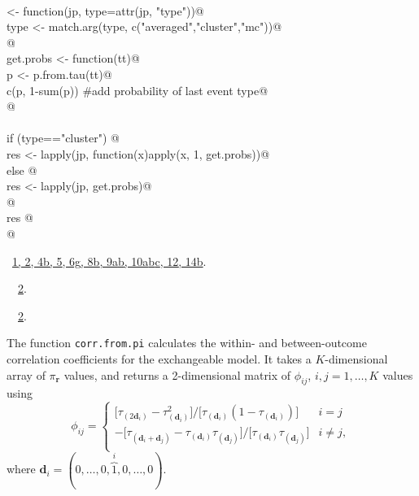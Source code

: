 \documentclass[reqno]{amsart}
\renewcommand{\NWlink}[2]{\hyperlink{#1}{#2}}
\newcommand{\rvec}{\mathbf{r}}
\newcommand{\dvec}{\mathbf{d}}
\begin{document}
\begin{flushleft}
\begin{list}{}{}
\mbox{}\verb@@\\
\mbox{}\verb@uniprobs <- function(jp, type=attr(jp, "type")){@\\
\mbox{}\verb@  type <- match.arg(type, c("averaged","cluster","mc"))@\\
\mbox{}\verb@  @\\
\mbox{}\verb@  get.probs <- function(tt){@\\
\mbox{}\verb@    p <- p.from.tau(tt)@\\
\mbox{}\verb@    c(p, 1-sum(p)) #add probability of last event type@\\
\mbox{}\verb@  }@\\
\mbox{}\verb@@\\
\mbox{}\verb@  if (type=="cluster") {@\\
\mbox{}\verb@    res <- lapply(jp, function(x)apply(x, 1, get.probs))@\\
\mbox{}\verb@  } else {@\\
\mbox{}\verb@    res <- lapply(jp, get.probs)@\\
\mbox{}\verb@  }@\\
\mbox{}\verb@  res  @\\
\mbox{}\verb@}@\\
\mbox{}\verb@@{\NWsep}
\end{list}
\vspace{-1.5ex}
\footnotesize
\begin{list}{}{\setlength{\itemsep}{-\parsep}\setlength{\itemindent}{-\leftmargin}}
\item \NWtxtFileDefBy\ \NWlink{nuweb1}{1}\NWlink{nuweb2}{, 2}\NWlink{nuweb4b}{, 4b}\NWlink{nuweb5}{, 5}\NWlink{nuweb6g}{, 6g}\NWlink{nuweb8b}{, 8b}\NWlink{nuweb9a}{, 9a}\NWlink{nuweb9b}{b}\NWlink{nuweb10a}{, 10a}\NWlink{nuweb10b}{b}\NWlink{nuweb10c}{c}\NWlink{nuweb12}{, 12}\NWlink{nuweb14b}{, 14b}.
\item \NWtxtIdentsDefed\nobreak\  \verb@uniprobs@\nobreak\ \NWlink{nuweb2}{2}.\item \NWtxtIdentsUsed\nobreak\  \verb@tau@\nobreak\ \NWlink{nuweb2}{2}.
\item{}
\end{list}
\vspace{4ex}
\end{flushleft}
The function \texttt{corr.from.pi} calculates the within- and between-outcome correlation coefficients for the
exchangeable model. It takes a $K$-dimensional array of $\pi_\rvec$ values, and returns a 2-dimensional
matrix of $\phi_{ij}$, $i,j=1, \ldots,K$ values using
\begin{equation} 
 \phi_{ij} = 
   \begin{cases}
   \big[\tau_{(2\dvec_i)} - \tau_{(\dvec_i)}^2\big]\big/\big[\tau_{(\dvec_i)} (1-\tau_{(\dvec_i)})\big] & i=j\\
  -\big[\tau_{(\dvec_i+\dvec_j)} - \tau_{(\dvec_i)}\tau_{(\dvec_j)}\big]\big/\big[\tau_{(\dvec_i)} \tau_{(\dvec_j)}\big] & i\ne j,\\
   \end{cases} 
\end{equation}
where $\dvec_i=(0,\ldots,0,\overbrace{1}^i,0,\ldots,0)$.
\end{document}
